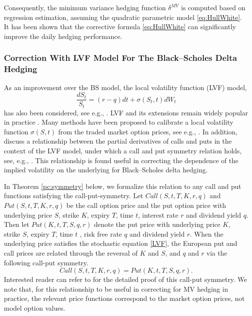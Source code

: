 \documentclass[letterpaper,12pt,titlepage,oneside,final]{book}
\numberwithin{equation}{section}
\theoremstyle{definition}
\begin{document}
 Consequently, the minimum variance hedging function $ \delta^{MV}$ is computed based on regression estimation, assuming 
 the quadratic parametric model \eqref{eq:HullWhite}.
 It has been shown \cite{hulloptimal} that the corrective formula \eqref{eq:HullWhite} can significantly improve the daily hedging performance.

 \subsubsection{Correction With LVF Model For  The Black–Scholes Delta Hedging}
 As an improvement over the BS model, the local volatility function (LVF) model,
 \begin{equation}\label{LVF}
\frac{dS_t}{S_t} = (r-q) dt + \sigma(S_t,t)   dW_t
\end{equation}
 has also been considered, see e.g., \citep{Dupire94,DermanKani94,DermanKani96}.
  LVF and its extensions remain widely popular in practice \cite{coleman2001reconstructing,crepey2004delta}. Many methods have been proposed to calibrate a local volatility function $\sigma(S,t)$ from the traded market option prices, see e.g., \citep{JackwerthRubenstein96,Andersen-etal98,CLV98}. In addition, \citet{coleman2001} discuss a relationship between the partial derivatives of  calls and puts in the context of the LVF model, under which a call and put symmetry relation holds, see,  e.g., \citep{Carr94,Carr98}. This relationship is found useful in correcting the dependence of the implied volatility on the underlying for Black–Scholes delta hedging.

In Theorem \ref{pc:symmetry} below, we formalize this relation \citep{coleman2001} to any call and put functions satisfying the call-put-symmetry.
Let $Call(S,t,T,K,r,q)$  and $Put(S,t,T,K,r,q)$ be the call option price and the put option price with underlying price $S$, strike $K$, expiry $T$, time $t$, interest rate $r$ and dividend yield $q$.  Then let  $Put(K,t,T,S,q,r)$ denote  the put price with underlying price $K$, strike $S$, expiry $T$, time $t$ , risk free rate  $q$ and dividend yield $r$.  When the underlying price satisfies the stochastic equation \eqref{LVF}, the European put and call prices are related through the reversal of $K$ and $S$, and $q$ and $r$ via the following call-put symmetry.
\begin{equation}
	Call(S, t,T,K,r, q)=Put(K, t,T,S , q, r).
	\label{eq:callputsymmetry}
\end{equation}
Interested reader can refer to \cite{guo2018black,coleman2001} for the detailed proof of this call-put symmetry.
 We note that, for this relationship to be useful in correcting for MV hedging in practice, the relevant price functions  correspond to the market option prices, not model option values.
\end{document}
